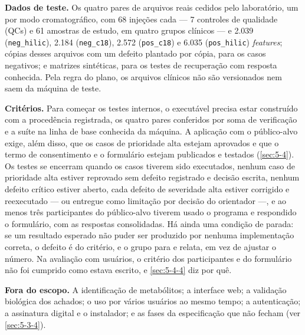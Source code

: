 \textbf{Dados de teste.} Os quatro pares de arquivos reais cedidos pelo laboratório, um por modo cromatográfico, com 68 injeções cada --- 7 controles de qualidade (QCs) e 61 amostras de estudo, em quatro grupos clínicos --- e 2.039 (\texttt{neg\_\allowbreak{}hilic}), 2.184 (\texttt{neg\_\allowbreak{}c18}), 2.572 (\texttt{pos\_\allowbreak{}c18}) e 6.035 (\texttt{pos\_\allowbreak{}hilic}) \textit{features}; cópias desses arquivos com um defeito plantado por cópia, para os casos negativos; e matrizes sintéticas, para os testes de recuperação com resposta conhecida. Pela regra do plano, os arquivos clínicos não são versionados nem saem da máquina de teste.


\textbf{Critérios.} Para começar os testes internos, o executável precisa estar construído com a procedência registrada, os quatro pares conferidos por soma de verificação e a suíte na linha de base conhecida da máquina. A aplicação com o público-alvo exige, além disso, que os casos de prioridade alta estejam aprovados e que o termo de consentimento e o formulário estejam publicados e testados (\ref{sec:5-4}). Os testes se encerram quando os casos tiverem sido executados, nenhum caso de prioridade alta estiver reprovado sem defeito registrado e decisão escrita, nenhum defeito crítico estiver aberto, cada defeito de severidade alta estiver corrigido e reexecutado --- ou entregue como limitação por decisão do orientador ---, e ao menos três participantes do público-alvo tiverem usado o programa e respondido o formulário, com as respostas consolidadas. Há ainda uma condição de parada: se um resultado esperado não puder ser produzido por nenhuma implementação correta, o defeito é do critério, e o grupo para e relata, em vez de ajustar o número. Na avaliação com usuários, o critério dos participantes e do formulário não foi cumprido como estava escrito, e \ref{sec:5-4-4} diz por quê.


\textbf{Fora do escopo.} A identificação de metabólitos; a interface web; a validação biológica dos achados; o uso por vários usuários ao mesmo tempo; a autenticação; a assinatura digital e o instalador; e as fases da especificação que não fecham (ver \ref{sec:5-3-4}).

